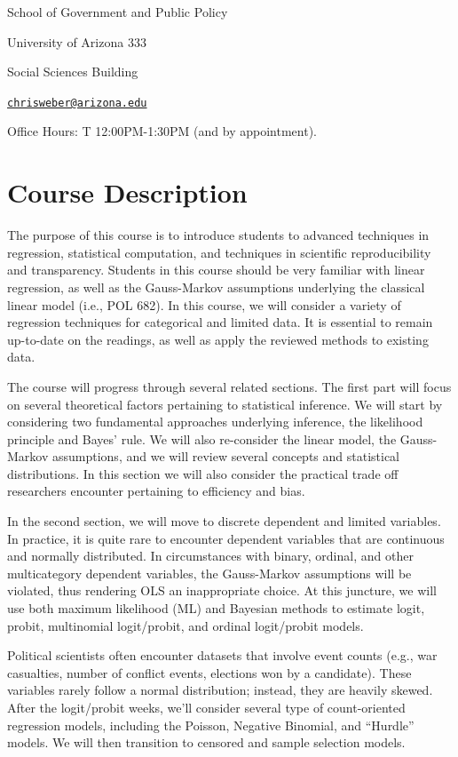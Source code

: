 \documentclass[
]{book}
\begin{document}
School of Government and Public Policy

University of Arizona 333

Social Sciences Building

\href{mailto:chrisweber@arizona.edu}{\nolinkurl{chrisweber@arizona.edu}}

Office Hours: T 12:00PM-1:30PM (and by appointment).

\section{Course Description}\label{course-description}

The purpose of this course is to introduce students to advanced techniques in regression, statistical computation, and techniques in scientific reproducibility and transparency. Students in this course should be very familiar with linear regression, as well as the Gauss-Markov assumptions underlying the classical linear model (i.e., POL 682). In this course, we will consider a variety of regression techniques for categorical and limited data. It is essential to remain up-to-date on the readings, as well as apply the reviewed methods to existing data.

The course will progress through several related sections. The first part will focus on several theoretical factors pertaining to statistical inference. We will start by considering two fundamental approaches underlying inference, the likelihood principle and Bayes' rule. We will also re-consider the linear model, the Gauss-Markov assumptions, and we will review several concepts and statistical distributions. In this section we will also consider the practical trade off researchers encounter pertaining to efficiency and bias.

In the second section, we will move to discrete dependent and limited variables. In practice, it is quite rare to encounter dependent variables that are continuous and normally distributed. In circumstances with binary, ordinal, and other multicategory dependent variables, the Gauss-Markov assumptions will be violated, thus rendering OLS an inappropriate choice. At this juncture, we will use both maximum likelihood (ML) and Bayesian methods to estimate logit, probit, multinomial logit/probit, and ordinal logit/probit models.

Political scientists often encounter datasets that involve event counts (e.g., war casualties, number of conflict events, elections won by a candidate). These variables rarely follow a normal distribution; instead, they are heavily skewed. After the logit/probit weeks, we'll consider several type of count-oriented regression models, including the Poisson, Negative Binomial, and ``Hurdle'' models. We will then transition to censored and sample selection models.
\end{document}
